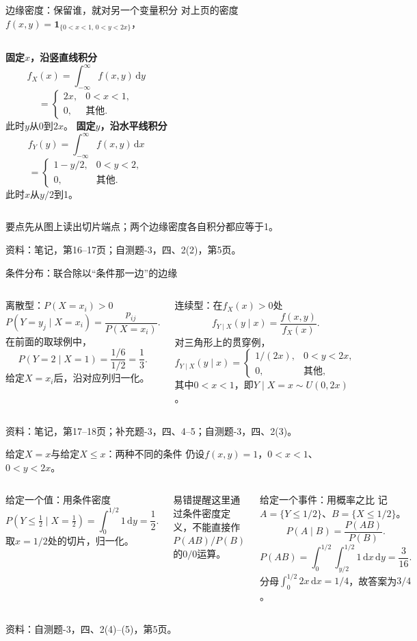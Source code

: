 \documentclass[aspectratio=169,10pt]{beamer}
\newcommand{\dd}{\,\mathrm{d}}
\newcommand{\ind}{\mathbf{1}}
\newcommand{\source}[1]{\vfill{\color{Muted}\fontsize{6.5}{8}\selectfont 资料：#1\par}}
\newcommand{\key}[1]{\begin{block}{要点}#1\end{block}}
\newcommand{\warn}[1]{\begin{alertblock}{易错提醒}#1\end{alertblock}}
\begin{document}
\begin{frame}[t]{边缘密度：保留谁，就对另一个变量积分}
对上页的密度$f(x,y)=\ind_{\{0<x<1,\,0<y<2x\}}$，
\begin{columns}[T]
\textbf{固定$x$，沿竖直线积分}
\[
f_X(x)=\int_{-\infty}^{\infty}f(x,y)\dd y
\]
\[
=\begin{cases}2x,&0<x<1,\\0,&\text{其他}.\end{cases}
\]
此时$y$从0到$2x$。
\textbf{固定$y$，沿水平线积分}
\[
f_Y(y)=\int_{-\infty}^{\infty}f(x,y)\dd x
\]
\[
=\begin{cases}1-y/2,&0<y<2,\\0,&\text{其他}.\end{cases}
\]
此时$x$从$y/2$到1。
\end{columns}
\key{先从图上读出切片端点；两个边缘密度各自积分都应等于1。}
\source{笔记，第16--17页；自测题-3，四、2(2)，第5页。}
\end{frame}

\begin{frame}[t]{条件分布：联合除以“条件那一边”的边缘}
\begin{columns}[T]
\begin{block}{离散型：$P(X=x_i)>0$}
\[
P(Y=y_j\mid X=x_i)=\frac{p_{ij}}{P(X=x_i)}.
\]
在前面的取球例中，
\[
P(Y=2\mid X=1)=\frac{1/6}{1/2}=\frac13.
\]
给定$X=x_i$后，沿对应列归一化。
\end{block}
\begin{block}{连续型：在$f_X(x)>0$处}
\[
f_{Y\mid X}(y\mid x)=\frac{f(x,y)}{f_X(x)}.
\]
对三角形上的贯穿例，
\[
f_{Y\mid X}(y\mid x)=\begin{cases}1/(2x),&0<y<2x,\\0,&\text{其他},\end{cases}
\]
其中$0<x<1$，即$Y\mid X=x\sim U(0,2x)$。
\end{block}
\end{columns}
\source{笔记，第17--18页；补充题-3，四、4--5；自测题-3，四、2(3)。}
\end{frame}

\begin{frame}[t]{给定$X=x$与给定$X\le x$：两种不同的条件}
仍设$f(x,y)=1$，$0<x<1$、$0<y<2x$。
\begin{columns}[T]
\begin{block}{给定一个值：用条件密度}
\[
P(Y\le\tfrac12\mid X=\tfrac12)=\int_0^{1/2}1\dd y=\boxed{\frac12}.
\]
取$x=1/2$处的切片，归一化。
\end{block}
\warn{这里通过条件密度定义，不能直接作$P(AB)/P(B)$的$0/0$运算。}
\begin{block}{给定一个事件：用概率之比}
记$A=\{Y\le1/2\}$、$B=\{X\le1/2\}$。
\[
P(A\mid B)=\frac{P(AB)}{P(B)}.
\]
\[
P(AB)=\int_0^{1/2}\!\int_{y/2}^{1/2}1\dd x\dd y=\frac3{16}.
\]
分母$\int_0^{1/2}2x\dd x=1/4$，故答案为$\boxed{3/4}$。
\end{block}
\end{columns}
\source{自测题-3，四、2(4)--(5)，第5页。}
\end{frame}
\end{document}

